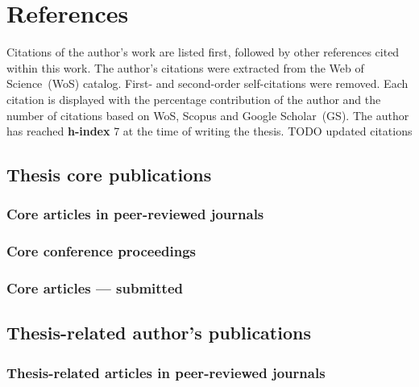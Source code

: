 \documentclass[a4paper,11pt,titlepage,twoside]{book}
\newcommand{\todo}[1]{{\color{red} TODO {#1}}}
\newcommand{\chapternoclear}[1]{
  \begingroup
  \let\cleardoublepage\clearpage
  \chapter{#1}
  \endgroup
}
\begin{document}
\chapternoclear{References}

Citations of the author's work are listed first, followed by other references cited within this work.
The author's citations were extracted from the Web of Science~(WoS) catalog.
First- and second-order self-citations were removed.
Each citation is displayed with the percentage contribution of the author and the number of citations based on WoS, Scopus and Google Scholar~(GS).
The author has reached \textbf{h-index} 7 at the time of writing the thesis.
\todo{updated citations}


\section{Thesis core publications}

\subsection*{Core articles in peer-reviewed journals}
\printbibliography[keyword={mine},keyword={phd_related},keyword={journal},keyword={core},notkeyword={submitted},heading=none,title={}]

\subsection*{Core conference proceedings}
\printbibliography[keyword={mine},keyword={phd_related},keyword={conference},keyword={core},notkeyword={submitted},heading=none,title={}]

\subsection*{Core articles --- submitted}
\printbibliography[keyword={mine},keyword={phd_related},keyword={submitted},keyword={core},heading=none,title={}]



\section{Thesis-related author's publications}

\subsection*{Thesis-related articles in peer-reviewed journals}
\printbibliography[keyword={mine},keyword={phd_related},keyword={journal},notkeyword={core},notkeyword={submitted},heading=none,title={}]
\end{document}
